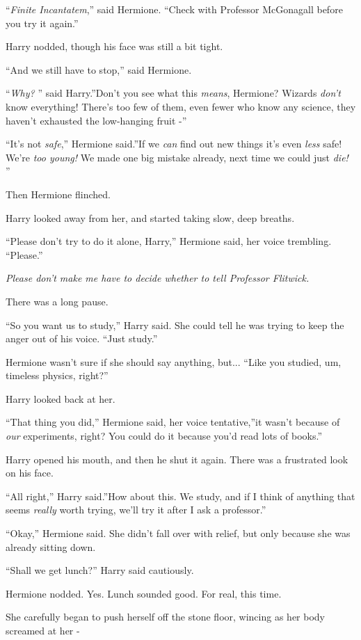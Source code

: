 ``\emph{Finite Incantatem},'' said Hermione. ``Check with Professor
McGonagall before you try it again.''

Harry nodded, though his face was still a bit tight.

``And we still have to stop,'' said Hermione.

``\emph{Why?} '' said Harry.''Don't you see what this \emph{means},
Hermione? Wizards \emph{don't} know everything! There's too few of them,
even fewer who know any science, they haven't exhausted the low-hanging
fruit -''

``It's not \emph{safe},'' Hermione said.''If we \emph{can} find out new
things it's even \emph{less} safe! We're \emph{too young!} We made one
big mistake already, next time we could just \emph{die!} ''

Then Hermione flinched.

Harry looked away from her, and started taking slow, deep breaths.

``Please don't try to do it alone, Harry,'' Hermione said, her voice
trembling. ``Please.''

\emph{Please don't make me have to decide whether to tell Professor
Flitwick.}

There was a long pause.

``So you want us to study,'' Harry said. She could tell he was trying to
keep the anger out of his voice. ``Just study.''

Hermione wasn't sure if she should say anything, but... ``Like you
studied, um, timeless physics, right?''

Harry looked back at her.

``That thing you did,'' Hermione said, her voice tentative,''it wasn't
because of \emph{our} experiments, right? You could do it because you'd
read lots of books.''

Harry opened his mouth, and then he shut it again. There was a
frustrated look on his face.

``All right,'' Harry said.''How about this. We study, and if I think of
anything that seems \emph{really} worth trying, we'll try it after I ask
a professor.''

``Okay,'' Hermione said. She didn't fall over with relief, but only
because she was already sitting down.

``Shall we get lunch?'' Harry said cautiously.

Hermione nodded. Yes. Lunch sounded good. For real, this time.

She carefully began to push herself off the stone floor, wincing as her
body screamed at her -

